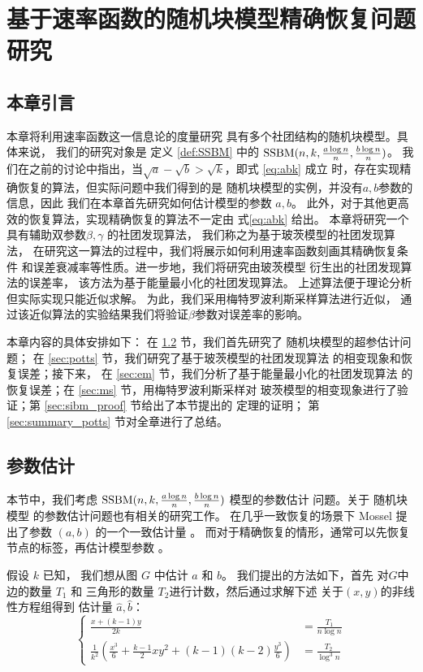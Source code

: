 
\chapter{基于速率函数的随机块模型精确恢复问题研究}\label{chap:sibm}
\section{本章引言}
本章将利用速率函数这一信息论的度量研究
具有多个社团结构的随机块模型。具体来说，
我们的研究对象是
定义 \ref{def:SSBM} 中的 $\operatorname{SSBM}(n,k,\frac{a \log n}{n}, \frac{b \log n}{n})$。
我们在之前的讨论中指出，当$\sqrt{a}-\sqrt{b}>\sqrt{k}$，即式 \eqref{eq:abk} 成立
时，存在实现精确恢复的算法，但实际问题中我们得到的是
随机块模型的实例，并没有$a,b$参数的信息，因此
我们在本章首先研究如何估计模型的参数 $a,b$。
此外，对于其他更高效的恢复算法，实现精确恢复的算法不一定由 式\eqref{eq:abk}
给出。
本章将研究一个具有辅助双参数$\beta,\gamma$ 的社团发现算法，
我们称之为基于玻茨模型的社团发现算法，
在研究这一算法的过程中，我们将展示如何利用速率函数刻画其精确恢复条件
和误差衰减率等性质。进一步地，我们将研究由玻茨模型
衍生出的社团发现算法的误差率，
该方法为基于能量最小化的社团发现算法。
上述算法便于理论分析但实际实现只能近似求解。
为此，我们采用梅特罗波利斯采样算法进行近似，
通过该近似算法的实验结果我们将验证$\beta$参数对误差率的影响。

本章内容的具体安排如下：
在 \ref{sec:parameter_estimation} 节，我们首先研究了
随机块模型的超参估计问题；
在 \ref{sec:potts} 节，我们研究了基于玻茨模型的社团发现算法
的相变现象和恢复误差；接下来，
在 \ref{sec:em} 节，我们分析了基于能量最小化的社团发现算法
的恢复误差；在 \ref{sec:ms} 节，用梅特罗波利斯采样对
玻茨模型的相变现象进行了验证；第 \ref{sec:sibm_proof} 节给出了本节提出的
定理的证明；
第 \ref{sec:summary_potts} 节对全章进行了总结。
\section{参数估计}\label{sec:parameter_estimation}


本节中，我们考虑 $\operatorname{SSBM}(n,k,\frac{a \log n}{n}, \frac{b \log n}{n})$ 模型的参数估计
问题。关于 随机块模型 的参数估计问题也有相关的研究工作。
在几乎一致恢复的场景下 Mossel 提出了参数 $(a,b)$ 的一个一致估计量
\cite{mossel2015reconstruction}。
而对于精确恢复的情形，通常可以先恢复节点的标签，再估计模型参数
\cite{abbe2015recovering}。

假设 $k$ 已知，
我们想从图 $G$ 中估计
$a$ 和 $b$。
我们提出的方法如下，首先
对$G$中 边的数量 $T_1$ 
和 三角形的数量
$T_2$进行计数，然后通过求解下述
关于$(x,y)$的非线性方程组得到
估计量 $\hat{a}, \hat{b}$：
\begin{equation} \label{eq:e_1}
\left\{
	\begin{alignedat}{1}
	\frac{x+(k-1)y}{2k}  &= \frac{T_1}{n\log n} \\
\frac{1}{k^2}
\left(\frac{x^3}{6} + \frac{k-1}{2}xy^2 + (k-1)(k-2)\frac{y^3}{6}\right)
 &= \frac{T_2}{\log^3 n}
	\end{alignedat}
\right.
\end{equation}


